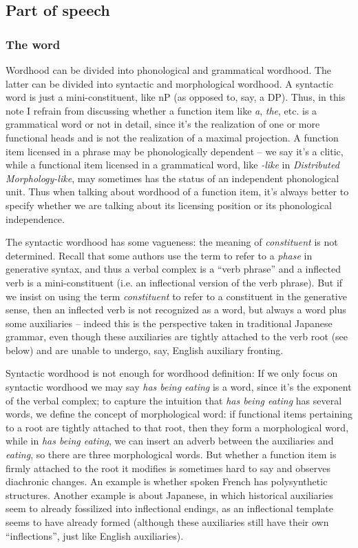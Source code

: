 \documentclass[UTF8, a4paper, oneside, scheme=plain, 12pt]{ctexbook}
\newcommand*{\term}[1]{\emph{#1}}
\newcommand{\form}[1]{\emph{#1}}
\begin{document}
{\subsection{Part of speech}

\subsubsection{The word}\label{sec:theory.word}

Wordhood can be divided into phonological and grammatical wordhood.
The latter can be divided into syntactic and morphological wordhood.
A syntactic word is just a mini-constituent,
like nP (as opposed to, say, a DP).
Thus, in this note I refrain from discussing whether a function item 
like \form{a}, \form{the}, etc. 
is a grammatical word or not in detail,
since it's the realization of one or more functional heads
and is not the realization of a maximal projection.
A function item licensed in a phrase
may be phonologically dependent -- we say it's a clitic,
while a functional item licensed in a grammatical word, 
like \form{-like} in \form{Distributed Morphology-like},
may sometimes has the status of an independent phonological unit.
Thus when talking about wordhood of a function item,
it's always better to specify whether we are talking about its 
licensing position or its phonological independence.

The syntactic wordhood has some vagueness:
the meaning of \term{constituent} is not determined.
Recall that some authors use the term to refer to a \emph{phase} in generative syntax,
and thus a verbal complex is a ``verb phrase'' 
and a inflected verb is a mini-constituent (i.e. an inflectional version of the verb phrase).
But if we insist on using the term \term{constituent} 
to refer to a constituent in the generative sense, 
then an inflected verb is not recognized as a word, 
but always a word plus some auxiliaries -- 
indeed this is the perspective taken in traditional Japanese grammar,
even though these auxiliaries are tightly attached to the verb root (see below)
and are unable to undergo, say, English auxiliary fronting.

Syntactic wordhood is not enough for wordhood definition:
If we only focus on syntactic wordhood 
we may say \form{has being eating} is a word,
since it's the exponent of the verbal complex;
to capture the intuition that \form{has being eating} has several words, 
we define the concept of morphological word:
if functional items pertaining to a root 
are tightly attached to that root, 
then they form a morphological word,
while in \form{has being eating},
we can insert an adverb between the auxiliaries and \form{eating},
so there are three morphological words.
But whether a function item is firmly attached to the root it modifies is sometimes hard to say 
and observes diachronic changes. 
An example is whether spoken French has polysynthetic structures.
Another example is about Japanese, 
in which historical auxiliaries seem to already fossilized into inflectional endings,
as an inflectional template seems to have already formed
(although these auxiliaries still have their own ``inflections'',
just like English auxiliaries).

}
\end{document}
